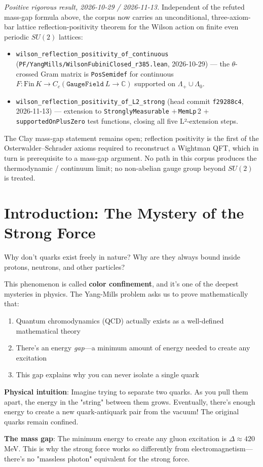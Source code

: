 \begin{chapterobjectives}
\emph{Positive rigorous result, 2026-10-29 / 2026-11-13.}  Independent of the refuted mass-gap formula above, the corpus now carries an unconditional, three-axiom-bar lattice reflection-positivity theorem for the Wilson action on finite even periodic $SU(2)$ lattices:
\begin{itemize}
\item \texttt{wilson\_reflection\_positivity\_of\_continuous}
  (\texttt{PF/YangMills/WilsonFubiniClosed\_r385.lean}, 2026-10-29) --- the
  $\theta$-crossed Gram matrix is \texttt{PosSemidef} for continuous
  $F : \mathrm{Fin}\,K \to C_c(\mathtt{GaugeField}\ L \to \mathbb{C})$
  supported on $\Lambda_+ \cup \Lambda_0$.
\item \texttt{wilson\_reflection\_positivity\_of\_L2\_strong}
  (head commit \texttt{f29288c4}, 2026-11-13) --- extension to
  \texttt{StronglyMeasurable} $+\,$\texttt{MemLp}\,2 $+\,$\texttt{supportedOnPlusZero} test functions, closing all five L²-extension steps.
\end{itemize}
The Clay mass-gap statement remains open; reflection positivity is the first of the Osterwalder--Schrader axioms required to reconstruct a Wightman QFT, which in turn is prerequisite to a mass-gap argument.  No path in this corpus produces the thermodynamic / continuum limit; no non-abelian gauge group beyond $SU(2)$ is treated.
\end{chapterobjectives}

\section{Introduction: The Mystery of the Strong Force}

\begin{intuitive}
Why don't quarks exist freely in nature? Why are they always bound inside protons, neutrons, and other particles?

This phenomenon is called \textbf{color confinement}, and it's one of the deepest mysteries in physics. The Yang-Mills problem asks us to prove mathematically that:
\begin{enumerate}
\item Quantum chromodynamics (QCD) actually exists as a well-defined mathematical theory
\item There's an energy \textit{gap}—a minimum amount of energy needed to create any excitation
\item This gap explains why you can never isolate a single quark
\end{enumerate}

\textbf{Physical intuition}: Imagine trying to separate two quarks. As you pull them apart, the energy in the "string" between them grows. Eventually, there's enough energy to create a new quark-antiquark pair from the vacuum! The original quarks remain confined.

\textbf{The mass gap}: The minimum energy to create any gluon excitation is $\Delta \approx 420$ MeV. This is why the strong force works so differently from electromagnetism—there's no "massless photon" equivalent for the strong force.
\end{intuitive}

